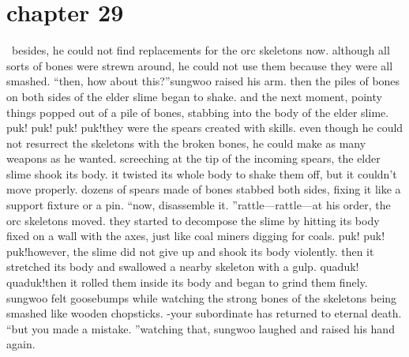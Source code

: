 \section{chapter 29}






 besides, he could not find replacements for the orc skeletons now.
 although all sorts of bones were strewn around, he could not use them because they were all smashed.
“then, how about this?”sungwoo raised his arm.
 then the piles of bones on both sides of the elder slime began to shake.
 and the next moment, pointy things popped out of a pile of bones, stabbing into the body of the elder slime.
puk! puk! puk! puk!they were the spears created with  skills.
 even though he could not resurrect the skeletons with the broken bones, he could make as many weapons as he wanted.
screeching at the tip of the incoming spears, the elder slime shook its body.
 it twisted its whole body to shake them off, but it couldn’t move properly.
 dozens of spears made of bones stabbed both sides, fixing it like a support fixture or a pin.
“now, disassemble it.
”rattle—rattle—at his order, the orc skeletons moved.
 they started to decompose the slime by hitting its body fixed on a wall with the axes, just like coal miners digging for coals.
puk! puk! puk!however, the slime did not give up and shook its body violently.
 then it stretched its body and swallowed a nearby skeleton with a gulp.
quaduk! quaduk!then it rolled them inside its body and began to grind them finely.
 sungwoo felt goosebumps while watching the strong bones of the skeletons being smashed like wooden chopsticks.
-your subordinate has returned to eternal death.
“but you made a mistake.
”watching that, sungwoo laughed and raised his hand again.

